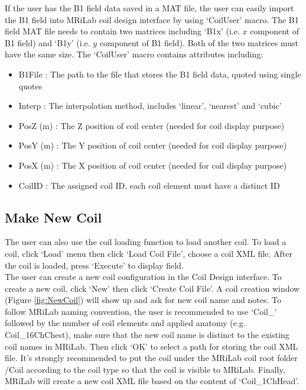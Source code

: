 \documentclass{book}%
\begin{document}
If the user has the B1 field data saved in a MAT file, the user can easily import the B1 field into MRiLab coil design interface by using `CoilUser' macro. The B1 field MAT file needs to contain two matrices including `B1x' (i.e. $x$ component of B1 field) and `B1y' (i.e. $y$ component of B1 field). Both of the two matrices must have the same size. The `CoilUser' macro contains attributes including:

\begin{itemize}
	\item B1File : The path to the file that stores the B1 field data, quoted using single quotes
	\item Interp : The interpolation method, includes `linear', `nearest' and `cubic'
	\item PosZ (m) : The Z position of coil center (needed for coil display purpose)
  \item PosY (m) : The Y position of coil center (needed for coil display purpose)
	\item PosX (m) : The X position of coil center (needed for coil display purpose)
	\item CoilID : The assigned coil ID, each coil element must have a distinct ID
\end{itemize}

\subsection{Make New Coil}

The user can also use the coil loading function to load another coil. To load a coil, click `Load' menu then click `Load Coil File', choose a coil XML file. After the coil is loaded, press `Execute' to display field.\\

The user can create a new coil configuration in the Coil Design interface. To create a new coil, click `New' then click `Create Coil File'. A coil creation window (Figure \ref{fig:NewCoil}) will show up and ask for new coil name and notes. To follow MRiLab naming convention, the user is recommended to use `Coil\_' followed by the number of coil elements and applied anatomy (e.g. Coil\_16ChChest), make sure that the new coil name is distinct to the existing coil names in MRiLab. Then click `OK' to select a path for storing the coil XML file. It's strongly recommended to put the coil under the MRiLab coil root folder /Coil according to the coil type so that the coil is visible to MRiLab. Finally, MRiLab will create a new coil XML file based on the content of `Coil\_1ChHead'.
\end{document}
